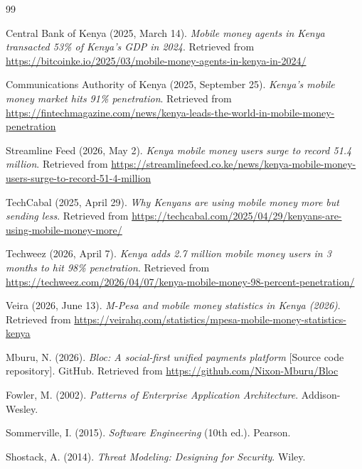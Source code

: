 \documentclass[12pt, a4paper, twoside, openright]{report}
\begin{document}
\begin{thebibliography}{99}

 Central Bank of Kenya (2025, March 14). \textit{Mobile money agents in Kenya transacted 53\% of Kenya's GDP in 2024}. Retrieved from \url{https://bitcoinke.io/2025/03/mobile-money-agents-in-kenya-in-2024/}

 Communications Authority of Kenya (2025, September 25). \textit{Kenya's mobile money market hits 91\% penetration}. Retrieved from \url{https://fintechmagazine.com/news/kenya-leads-the-world-in-mobile-money-penetration}

 Streamline Feed (2026, May 2). \textit{Kenya mobile money users surge to record 51.4 million}. Retrieved from \url{https://streamlinefeed.co.ke/news/kenya-mobile-money-users-surge-to-record-51-4-million}

 TechCabal (2025, April 29). \textit{Why Kenyans are using mobile money more but sending less}. Retrieved from \url{https://techcabal.com/2025/04/29/kenyans-are-using-mobile-money-more/}

 Techweez (2026, April 7). \textit{Kenya adds 2.7 million mobile money users in 3 months to hit 98\% penetration}. Retrieved from \url{https://techweez.com/2026/04/07/kenya-mobile-money-98-percent-penetration/}

 Veira (2026, June 13). \textit{M-Pesa and mobile money statistics in Kenya (2026)}. Retrieved from \url{https://veirahq.com/statistics/mpesa-mobile-money-statistics-kenya}

 Mburu, N. (2026). \textit{Bloc: A social-first unified payments platform} [Source code repository]. GitHub. Retrieved from \url{https://github.com/Nixon-Mburu/Bloc}

 Fowler, M. (2002). \textit{Patterns of Enterprise Application Architecture}. Addison-Wesley.

 Sommerville, I. (2015). \textit{Software Engineering} (10th ed.). Pearson.

 Shostack, A. (2014). \textit{Threat Modeling: Designing for Security}. Wiley.

\end{thebibliography}

\clearpage

\end{document}
